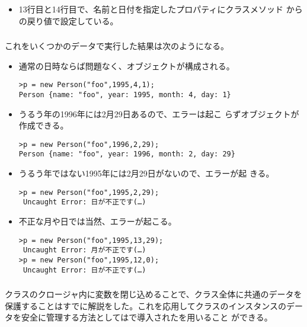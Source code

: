\begin{frame}[containsverbatim]
\begin{frame}[containsverbatim]
\begin{itemize}
\begin{itemize}
       \end{itemize}
 \item 13行目と14行目で、名前と日付を指定したプロパティにクラスメソッド
       からの戻り値で設定している。
\end{itemize}
\end{frame}
\begin{frame}[containsverbatim]
 \frametitle{}
これをいくつかのデータで実行した結果は次のようになる。
\begin{itemize}
 \item 通常の日時ならば問題なく、オブジェクトが構成される。
\begin{Verbatim}
>p = new Person("foo",1995,4,1);
Person {name: "foo", year: 1995, month: 4, day: 1}
\end{Verbatim}
 \item うるう年の1996年には2月29日あるので、エラーは起こ
			 らずオブジェクトが作成できる。
\begin{Verbatim}
>p = new Person("foo",1996,2,29);
Person {name: "foo", year: 1996, month: 2, day: 29}
\end{Verbatim}
 \item うるう年ではない1995年には2月29日がないので、エラーが起
			 きる。
\begin{Verbatim}
>p = new Person("foo",1995,2,29);
 Uncaught Error: 日が不正です(…)
\end{Verbatim}
 \item 不正な月や日では当然、エラーが起こる。
\begin{Verbatim}
>p = new Person("foo",1995,13,29);
 Uncaught Error: 月が不正です(…)
>p = new Person("foo",1995,12,0);
 Uncaught Error: 日が不正です(…)
\end{Verbatim}
\end{itemize}
\end{frame}


\begin{frame}[containsverbatim]
 \frametitle{}
\end{frame}

\begin{frame}[containsverbatim]
 \frametitle{}
\end{frame}
\begin{frame}[containsverbatim]
 \frametitle{}
\end{frame}


クラスのクロージャ内に変数を閉じ込めることで、クラス全体に共通のデータを
保護することはすでに解説をした。これを応用してクラスのインスタンスのデー
タを安全に管理する方法としては\ES で導入されたを用いること
ができる。


\end{frame}
